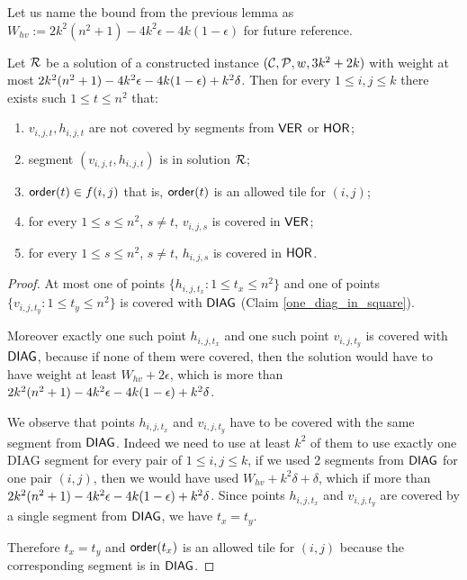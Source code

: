 {{{{Let us name the bound from the previous lemma
as $W_{hv} := 2k^2(n^2+1) -4k^2\epsilon -4k(1-\epsilon)$
for future reference.

\begin{lemma}
\label{diag_correct}
Let $\mathcal{R}$ be a solution 
of a constructed instance $(\mathcal{C}, \mathcal{P}, w, 3k^2+2k)$
with weight at most  $2k^2(n^2+1) - 4k^2\epsilon -4k(1-\epsilon) +k^2\delta$.
Then for every $1 \le i,j \le k$
there exists such $1 \le t \le n^2$ that:
\begin{enumerate}[label={(\arabic*)}]
\item $v_{i,j,t}, h_{i,j,t}$ are not covered by segments from $\mathsf{VER}$ or $\mathsf{HOR}$;
\item segment $(v_{i,j,t}, h_{i,j,t})$ is in solution $\mathcal{R}$;
\item $\mathsf{order}(t) \in f(i,j)$ that is, $\mathsf{order}(t)$ is an allowed tile for $(i,j)$;
\item for every $1 \le s\le n^2$, $s \neq t$, $v_{i,j,s}$ is covered in $\mathsf{VER}$;
\item for every $1 \le s\le n^2$, $s \neq t$, $h_{i,j,s}$ is covered in $\mathsf{HOR}$.
\end{enumerate}
\end{lemma}

\begin{proof}
At most one of points $\{h_{i,j,t_x} : 1 \le t_x \le n^2\}$
and one of points $\{v_{i,j,t_y} : 1 \le t_y \le n^2\}$
is covered with $\mathsf{DIAG}$
(Claim \ref{one_diag_in_square}).
	
Moreover exactly one such point $h_{i,j,t_x}$ and one such point $v_{i,j,t_y}$
is covered with $\mathsf{DIAG}$,
because if none of them were covered, then the solution would have to
have weight at least $W_{hv} + 2\epsilon$, which is more than $2k^2(n^2+1) - 4k^2\epsilon -4k(1-\epsilon) +k^2\delta$.

We observe that points $h_{i,j,t_x}$ and $v_{i,j,t_y}$
have to be covered with the same segment from $\mathsf{DIAG}$.
Indeed we need to use at least $k^2$ of them to use
exactly one DIAG segment for every pair of $1 \le i,j \le k$,
if we used 2 segments from $\mathsf{DIAG}$
for one pair $(i,j)$,
then we would have used $W_{hv} + k^2\delta + \delta$,
which if more than $2k^2(n^2+1) - 4k^2\epsilon -4k(1-\epsilon) +k^2\delta$.
Since points $h_{i,j,t_x}$ and $v_{i,j,t_y}$ are covered by
a single segment from $\mathsf{DIAG}$, we have $t_x = t_y$.

Therefore $t_x = t_y$
and $\mathsf{order}(t_x)$ is an allowed tile for $(i,j)$
because the corresponding segment is in $\mathsf{DIAG}$.
\end{proof}

\newcommand{\diagonal}{\mathsf{diagonal}}

}}}}
